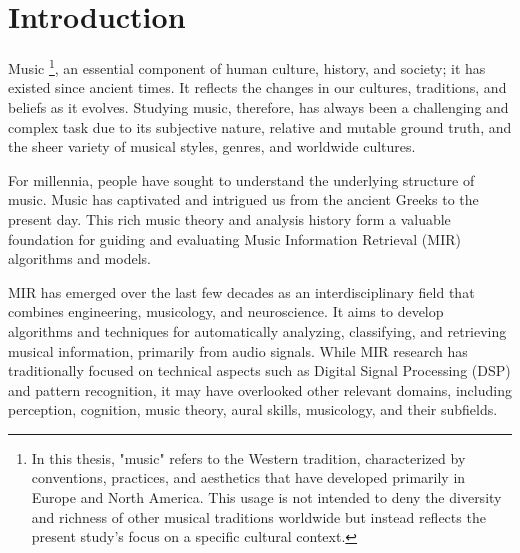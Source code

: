 \chapter{Introduction}

Music \footnote{In this thesis, "music" refers to the Western tradition, characterized by conventions, practices, and aesthetics that have developed primarily in Europe and North America. This usage is not intended to deny the diversity and richness of other musical traditions worldwide but instead reflects the present study's focus on a specific cultural context.}, an essential component of human culture, history, and society; it has existed since ancient times. It reflects the changes in our cultures, traditions, and beliefs as it evolves. Studying music, therefore, has always been a challenging and complex task due to its subjective nature, relative and mutable ground truth, and the sheer variety of musical styles, genres, and worldwide cultures.

For millennia, people have sought to understand the underlying structure of music. Music has captivated and intrigued us from the ancient Greeks to the present day. This rich music theory and analysis history form a valuable foundation for guiding and evaluating Music Information Retrieval (MIR) algorithms and models.

MIR has emerged over the last few decades as an interdisciplinary field that combines engineering, musicology, and neuroscience. It aims to develop algorithms and techniques for automatically analyzing, classifying, and retrieving musical information, primarily from audio signals. While MIR research has traditionally focused on technical aspects such as Digital Signal Processing (DSP) and pattern recognition, it may have overlooked other relevant domains, including perception, cognition, music theory, aural skills, musicology, and their subfields.